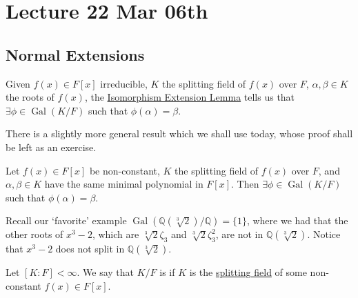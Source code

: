 \documentclass[notoc,notitlepage,nobib]{tufte-book}
\DeclareMathOperator{\Gal}{Gal}
\begin{document}


\chapter{Lecture 22 Mar 06th}%
\label{chp:lecture_22_mar_06th}

\section{Normal Extensions}%
\label{sec:normal_extensions}

\begin{note}
  Given $f(x) \in F[x]$ irreducible, $K$ the splitting field of $f(x)$ over $F$,
  $\alpha, \beta \in K$ the roots of $f(x)$, the
  \hyperref[lemma:isomorphism_extension_lemma]{Isomorphism Extension Lemma}
  tells us that $\exists \phi \in \Gal(K / F)$ such that $\phi(\alpha) = \beta$.
\end{note}

There is a slightly more general result which we shall use today, whose proof
shall be left as an exercise.

\begin{ex}\label{ex:galois_permutations_work_even_with_reducible_polyms}
  Let $f(x) \in F[x]$ be non-constant, $K$ the splitting field of $f(x)$ over
  $F$, and $\alpha, \beta \in K$ have the same minimal polynomial in $F[x]$.
  Then $\exists \phi \in \Gal(K / F)$ such that $\phi(\alpha) = \beta$.
\end{ex}

\begin{eg}
  Recall our `favorite' example $\Gal( \mathbb{Q}(\sqrt[3]{2}) / \mathbb{Q} ) =
  \{ 1 \}$, where we had that the other roots of $x^3 - 2$, which are
  $\sqrt[3]{2} \zeta_3$ and $\sqrt[3]{2} \zeta_3^2$, are not in
  $\mathbb{Q}(\sqrt[3]{2})$. Notice that $x^3 - 2$ does not split in
  $\mathbb{Q}(\sqrt[3]{2})$.
\end{eg}

\begin{defn}\label{defn:normal_extension}
  Let $[ K : F ] < \infty$. We say that $K / F$ is  if $K$ is
  the \hyperref[defn:splitting_field]{splitting field} of some non-constant
  $f(x) \in F[x]$.
\end{defn}
\end{document}
